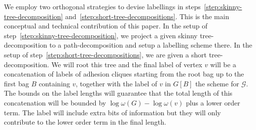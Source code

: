 We employ two orthogonal strategies to devise labellings in steps~\ref{step:skinny-tree-decomposition} and~\ref{step:short-tree-decompositions}.
This is the main conceptual and technical contribution of this paper.
In the setup of step~\ref{step:skinny-tree-decomposition},
we project a given skinny tree-decomposition to a path-decomposition and setup a labelling scheme there.
In the setup of step~\ref{step:short-tree-decompositions}, we are given a short tree-decomposition.
We will root this tree and the final label of vertex $v$ will be a concatenation of labels of adhesion cliques starting from the root bag up to the first bag $B$ containing $v$,
together with the label of $v$ in $G[B]$ the scheme for $\mathcal{G}$.
The bounds on the label lengths will guarantee that the total length of this concatenation will be bounded by $\log\omega(G)-\log\omega(v)$ plus a lower order term.
The label will include extra bits of information but they will only contribute to the lower order term in the final length.





